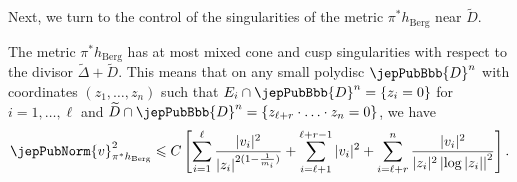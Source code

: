 Next, we turn to the control of the singularities of the metric $\pi^\ast h_{\mathrm{Berg}}$ near $\widetilde{D}$.

\begin{lemma} The metric $\pi^\ast h_{\mathrm{Berg}}$ has at most mixed cone and cusp singularities with respect to the divisor $\widetilde{\Delta} + \widetilde{D}$. This means that on any small polydisc $\jepPubBbb{D}^n$ with coordinates $(z_1, \ldots , z_n)$ such that $E_i \cap \jepPubBbb{D}^n = \left\{ z_i = 0 \right\}$ for $i = 1, \ldots, \ell$ and $\widetilde{D} \cap \jepPubBbb{D}^n = \left\{ z_{\ell+r} \cdot \ldots \cdot z_{n} = 0 \right\}$, we have
\begin{equation} \label{published:22}
\jepPubNorm{v}^2_{\pi^\ast h_{\mathrm{Berg}}} \leqslant C \left[ \sum_{i = 1}^{\ell} \frac{|v_i|^2}{|z_i|^{2(1 - \frac{1}{m_i})}} + \sum_{i=\ell+1}^{\ell+r-1} |v_i|^2 + \sum_{i = \ell + r }^{n} \frac{|v_i|^2}{|z_i|^2 \left| \log |z_i| \right|^2} \right].
\end{equation}
\end{lemma}

